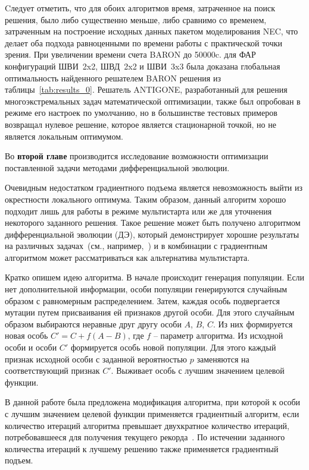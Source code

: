 Cледует отметить, что для обоих алгоритмов время, затраченное на поиск решения, было либо существенно меньше, либо сравнимо со временем, затраченным на построение исходных данных пакетом моделирования NEC, что делает оба подхода равноценными по времени работы с практической точки зрения. При увеличении времени счета BARON до 50000c. для ФАР конфигураций ШВИ~2x2, ШВД~2x2 и ШВИ~3x3 была доказана глобальная оптимальность найденного решателем BARON решения из таблицы~\ref{tab:results_0}.
Решатель ANTIGONE, разработанный для решения многоэкстремальных задач математической оптимизации, также был опробован в режиме его настроек по умолчанию, но в большинстве тестовых примеров возвращал нулевое решение, которое является стационарной точкой, но не является локальным оптимумом.

Во {\textbf{второй главе}} производится исследование возможности оптимизации поставленной задачи методами дифференциальной эволюции.

Очевидным недостатком градиентного подъема является невозможность выйти из окрестности локального оптимума. Таким образом, данный алгоритм хорошо подходит лишь для работы в режиме мультистарта или же для уточнения некоторого заданного решения. Такое решение может быть получено алгоритмом дифференциальной эволюции (ДЭ), который  демонстрирует хорошие результаты на различных задачах~(см., например,~) и в комбинации с градиентным алгоритмом может рассматриваться как альтернатива мультистарта.

Кратко опишем идею алгоритма. В начале происходит генерация популяции. Если нет дополнительной информации, особи популяции генерируются случайным образом с равномерным распределением. Затем, каждая особь подвергается мутации путем присваивания ей признаков другой особи.
Для этого случайным образом выбираются неравные друг другу особи $A$, $B$, $C$. Из них формируется новая особь $C' = C + f(A - B)$, где $f$ -- параметр алгоритма. Из исходной особи и особи $C'$ формируется особь новой популяции. Для этого каждый признак исходной особи с заданной вероятностью $p$ заменяются на соответствующий признак $C'$. Выживает особь с лучшим значением целевой функции.

В данной работе была предложена модификация алгоритма, при которой к особи с лучшим значением целевой функции применяется градиентный алгоритм, если количество итераций алгоритма превышает двухкратное количество итераций, потребовавшееся для получения текущего рекорда~. По истечении заданного количества итераций к лучшему решению также применяется градиентный подъем.

